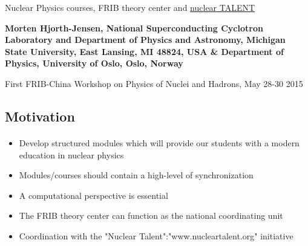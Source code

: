 \documentclass[%
twoside,                 %
final,                   %
10pt]{article}
\begin{document}






\thispagestyle{empty}

\begin{center}
{\LARGE\bf
\begin{spacing}{1.25}
Nuclear Physics courses, FRIB theory center and \href{{http://www.nucleartalent.org}}{nuclear TALENT}
\end{spacing}
}
\end{center}


\begin{center}
{\bf Morten Hjorth-Jensen, National Superconducting Cyclotron Laboratory and Department of Physics and Astronomy, Michigan State University, East Lansing, MI 48824, USA {\&} Department of Physics, University of Oslo, Oslo, Norway${}^{}$} \\ [0mm]
\end{center}

    \begin{center}
\end{center}
    

\begin{center} %
First FRIB-China Workshop on Physics of Nuclei and Hadrons, May 28-30 2015
\end{center}

\vspace{1cm}


\subsection{Motivation}

\paragraph{}
\begin{itemize}
\item Develop structured modules which will provide our students with a modern education in nuclear physics

\item Modules/courses should contain a high-level of synchronization

\item A computational perspective is essential

\item The FRIB theory center can function as the national coordinating unit

\item Coordination with the "Nuclear Talent":"www.nucleartalent.org" initiative
\end{itemize}
\end{document}
